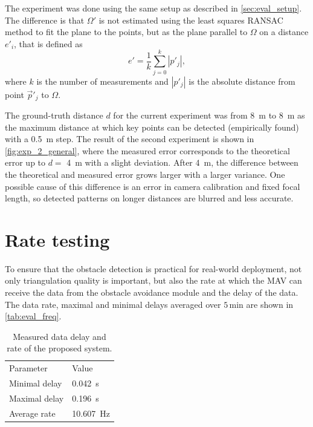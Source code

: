 The experiment was done using the same setup as described in \autoref{sec:eval_setup}. 
The difference is that $\Omega'$ is not estimated using the least squares RANSAC method to fit the plane to the points, but as the plane parallel to $\Omega$ on a distance $e'_i$, that is defined as
\begin{equation}    
    e' = \frac{1}{k} \sum_{j=0}^{k}{|p'_j|},
\end{equation}
where $k$ is the number of measurements and $|p'_j|$ is the absolute distance from point $\vec{p}'_j$ to $\Omega$.


The ground-truth distance $d$ for the current experiment was from \SI{8}{\meter} to \SI{8}{\meter} as the maximum distance at which key points can be detected (empirically found) with a \SI{0.5}{\meter} step.
The result of the second experiment is shown in \autoref{fig:exp_2_general}, where the measured error corresponds to the theoretical error up to $d=$ \SI{4}{\meter} with a slight deviation. 
After \SI{4}{\meter}, the difference between the theoretical and measured error grows larger with a larger variance.
One possible cause of this difference is an error in camera calibration and fixed focal length, so detected patterns on longer distances are blurred and less accurate. 

\section{Rate testing}
To ensure that the obstacle detection is practical for real-world deployment, not only triangulation quality is important, but also the rate at which the MAV can receive the data from the obstacle avoidance module and the delay of the data.
The data rate, maximal and minimal delays averaged over $5\,$min are shown in \autoref{tab:eval_freq}.
\begin{table}[ht]
    \begin{center}
      \begin{tabular}{ll}
      \hline
        Parameter & Value \\
        Minimal delay &  \SI{0.042}{\second} \\
        Maximal delay &  \SI{0.196}{\second} \\
        Average rate & \SI{10.607}{\hertz} \\ 
      \end{tabular}
    \end{center}
    \caption{Measured data delay and rate of the proposed system.}
    \label{tab:eval_freq}
\end{table}
 
